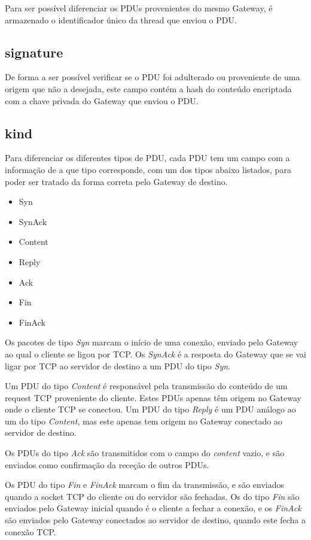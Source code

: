 \documentclass[a4paper]{report}
\begin{document}
Para ser possível diferenciar os PDUs provenientes do mesmo Gateway,
é armazenado o identificador único da thread que enviou o PDU.

\subsection{signature}

De forma a ser possível verificar se o PDU foi adulterado ou proveniente
de uma origem que não a desejada, este campo contém a hash do conteúdo
encriptada com a chave privada do Gateway que enviou o PDU.

\subsection{kind} \label{subs:kind}

Para diferenciar os diferentes tipos de PDU, cada PDU tem um campo
com a informação de a que tipo corresponde, com um dos tipos abaixo
listados, para poder ser tratado da forma correta pelo Gateway de 
destino.

\begin{itemize}
        \item Syn
        \item SynAck
        \item Content
        \item Reply
        \item Ack
        \item Fin
        \item FinAck
\end{itemize}

Os pacotes de tipo \textit{Syn} marcam o início de uma conexão, enviado
pelo Gateway ao qual o cliente se ligou por TCP. Os \textit{SynAck}
é a resposta do Gateway que se vai ligar por TCP ao servidor de destino
a um PDU do tipo \textit{Syn}.

Um PDU do tipo \textit{Content} é responsável pela transmissão do conteúdo
de um request TCP proveniente do cliente. Estes PDUs apenas têm origem
no Gateway onde o cliente TCP se conectou. Um PDU do tipo \textit{Reply}
é um PDU análogo ao um do tipo \textit{Content}, mas este apenas tem origem
no Gateway conectado ao servidor de destino.

Os PDUs do tipo \textit{Ack} são transmitidos com o campo do \textit{content}
vazio, e são enviados como confirmação da receção de outros PDUs.

Os PDU do tipo \textit{Fin} e \textit{FinAck} marcam o fim da transmissão,
e são enviados quando a socket TCP do cliente ou do servidor são fechadas.
Os do tipo \textit{Fin} são enviados pelo Gateway inicial quando é o 
cliente a fechar a conexão, e os \textit{FinAck} são enviados pelo Gateway
conectados ao servidor de destino, quando este fecha a conexão TCP.
\end{document}
